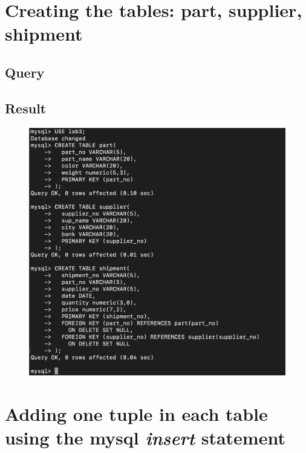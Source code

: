 \documentclass[12pt]{article}
\begin{document}
\newpage

\section{Creating the tables: part, supplier, shipment}

\subsection{Query}
\newpage
\subsection{Result}
\begin{figure}[!hbt]
    \centering
    \includegraphics[scale=0.65]{screenshots/2.png}
    \label{fig:my_label1}
\end{figure}
\newpage


\section{Adding one tuple in each table using the mysql \textit{insert} statement}
\end{document}
